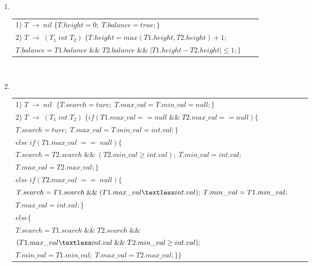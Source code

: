 \documentclass[a4paper, justified]{tufte-handout}
\begin{document}
\begin{solution}
\begin{enumerate}[(1)]
    \item \indent\\
\tablefirsthead{%
\hline}
\tablehead{%
\hline}
\tabletail{%
\hline}
\tablelasttail{\hline}
\begin{supertabular}[h]{|l|l|l|}
) $T\;{\rightarrow}\;nil\; \{T.height=0;\;T.balance=true;\}\;$\\
2) $T\;{\rightarrow}\;(T_1\;int\;T_2)\; \{T.height=max(T1.height,T2.height)+1;\;$\\\qquad\qquad $T.balance= T1.balance\;\&\&\;T2.balance\;\&\&\;|T1.height-T2.height|\leq1;\}$    \\
 \hline
\end{supertabular}\\
    \item \indent\\
    \tablefirsthead{%
\hline
}
\tablelasttail{\hline}
\begin{supertabular}[h]{|l|l|l|}
) $T\;{\rightarrow}\;nil\;$ $\{T.search=ture;\;T.max\_val=T.min\_val=null;\}$\\
2) $T\;{\rightarrow}\;(T_1\;int\;T_2)\;\{if(T1.max\_val==null\;\&\&\; T2.max\_val==null)\{$\\
\qquad\qquad\qquad\qquad\qquad $T.search=ture;\;T.max\_val=T.min\_val=int.val;\}$\\
\qquad\qquad\qquad\qquad\quad $else\; if(T1.max\_val\;==\;null)\{$\\
\qquad\qquad\qquad\qquad\qquad $T.search=T2.search\;\&\&\;(T2.min\_val\geq int.val) ;\;T.min\_val=int.val;\;$\\
\qquad\qquad\qquad\qquad\qquad $T.max\_val=T2.max\_val;\}$\\
\qquad\qquad\qquad\qquad\quad $else\; if(T2.max\_val\;==\;null)\{$\\
\qquad\qquad\qquad\qquad\qquad $T.search=T1.search\;\&\&\;(T1.max\_val\textless int.val);\;T.min\_val=T1.min\_val;\;$\\
\qquad\qquad\qquad\qquad\qquad $T.max\_val=int.val;\}$\\
\qquad\qquad\qquad\qquad\quad $else\{$\\
\qquad\qquad\qquad\qquad\qquad $T.search=T1.search\;\&\&\;T2.search\;\&\&\;$\\
\qquad\qquad\qquad\qquad\qquad$(T1.max\_val\textless int.val\;\&\&\;T2.min\_val\geq int.val);$\\
\qquad\qquad\qquad\qquad\qquad $T.min\_val=T1.min\_val;\;
T.max\_val=T2.max\_val;
\}\}
$\\
\hline
\end{supertabular}
\end{enumerate}
\end{solution}
\end{document}
